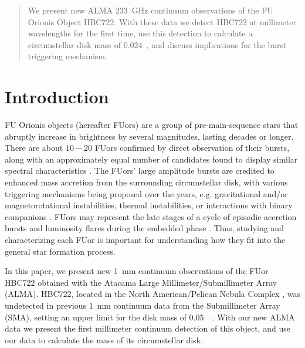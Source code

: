 \documentclass{aastex63}
\begin{document}
\author{Steven N.~Longmore}




\begin{abstract}
    We present new ALMA 233~GHz continuum observations of the FU Orionis Object HBC722.  With these data we detect HBC722 at millimeter wavelengths for the first time, use this detection to calculate a circumstellar disk mass of 0.024~\msun, and discuss implications for the burst triggering mechanism.
\end{abstract}

\section{Introduction}\label{sec_intro}
FU Orionis objects (hereafter FUors) are a group of pre-main-sequence stars that abruptly increase in brightness by several magnitudes, lasting decades or longer. There are about $10-20$ FUors confirmed by direct observation of their bursts, along with an approximately equal number of candidates found to display similar spectral characteristics \citep[e.g.,][]{reipurthaspin2010:fuors}. The FUors’ large amplitude bursts are credited to enhanced mass accretion from the surrounding circumstellar disk, with various triggering mechanisms being proposed over the years, e.g. gravitational and/or magnetorotational instabilities, thermal instabilities, or interactions with binary companions \citep[e.g.,][]{hartmann1985:fuors,hartmann1996:fuors,audard2014:ppvi}.  FUors may represent the late stages of a cycle of episodic accretion bursts and luminosity flares during the embedded phase \citep{dunham2014:ppvi}.  Thus, studying and characterizing each FUor is important for understanding how they fit into the general star formation process.

In this paper, we present new 1~mm continuum observations of the FUor HBC722 obtained with the Atacama Large Millimeter/Submillimeter Array (ALMA).  HBC722, located in the North American/Pelican Nebula Complex \citep[$d \sim 800$~pc;][]{zucker2020:distances}, was undetected in previous 1~mm continuum data from the Submillimeter Array (SMA), setting an upper limit for the disk mass of 0.05~\msun\ \citep[after rescaling to the current distance;][]{dunham2012:hbc722}. With our new ALMA data we present the first millimeter continuum detection of this object, and use our data to calculate the mass of its circumstellar disk.
\end{document}
